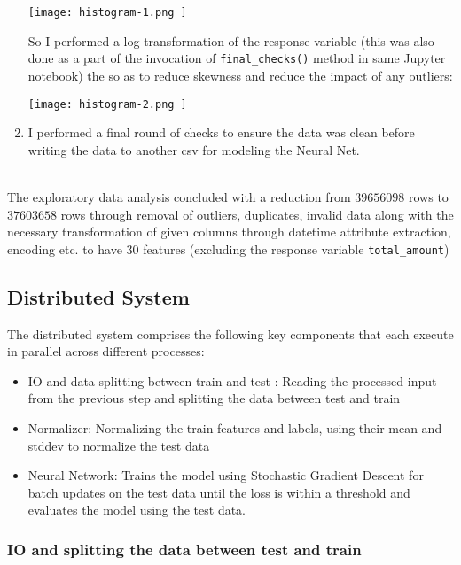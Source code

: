 \documentclass{article}
\begin{document}
\begin{enumerate}
    \begin{center}
    \texttt{[image: histogram-1.png ]}
    \end{center}

    So I performed a log transformation of the response variable (this was also done as a part of the invocation of \verb|final_checks()| method in same Jupyter notebook) the  so as to reduce skewness and reduce the impact of any outliers:

    \begin{center}
    \texttt{[image: histogram-2.png ]}
    \end{center}
    
    \item I performed a final round of checks to ensure the data was clean before writing the data to another csv for modeling the Neural Net.
\end{enumerate} \\

The exploratory data analysis concluded with a reduction from $39656098$ rows to $37603658$ rows through removal of outliers, duplicates, invalid data along with the necessary transformation of given columns through datetime attribute extraction, encoding etc. to have $30$ features (excluding the response variable \verb|total_amount|)

\subsection{Distributed System}
The distributed system comprises the following key components that each execute in parallel across different processes:
\begin{itemize}
    \item IO and data splitting between train and test : Reading the processed input from the previous step and splitting the data between test and train 
    \item Normalizer: Normalizing the train features and labels, using their mean and stddev to normalize the test data
    \item Neural Network: Trains the model using Stochastic Gradient Descent for batch updates on the test data until the loss is within a threshold and evaluates the model using the test data. 
\end{itemize}

\subsubsection{IO and splitting the data between test and train}
\end{document}
